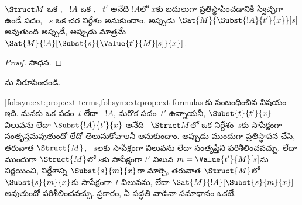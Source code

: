 \documentclass[../../../include/open-logic-section]{subfiles}
\begin{document}
\begin{prop} $\Struct M$ ఒక
, ~$!A$ ఒక , ~$t'$ అనేది $!A$లో $x$కు బదులుగా ప్రతిస్థాపించడానికి స్వేచ్ఛగా ఉండే పదం, ~$s$ ఒక చర
నిర్దేశం అనుకుందాం. అప్పుడు $\Sat{M}{\Subst{!A}{t'}{x}}[s]$ అవుతుంది
అప్పుడే, అప్పుడు మాత్రమే
$\Sat{M}{!A}[\Subst{s}{\Value{t'}{M}[s]}{x}]$.
\end{prop}

\begin{proof}
సాధన.
\end{proof}

\begin{prob}
ను నిరూపించండి.
\end{prob}

\begin{explain}
  \cref{fol:syn:ext:prop:ext-terms,fol:syn:ext:prop:ext-formulas}కు సంబంధించిన
  విషయం ఇది. మనకు ఒక పదం~$t$ లేదా ~$!A$, మరొక పదం~$t'$
  ఉన్నాయనీ, $\Subst{t}{t'}{x}$ విలువను లేదా
  $\Subst{!A}{t'}{x}$ అనేది ~$\Struct M$లో
  ఒక  నిర్దేశం~$s$కు సాపేక్షంగా సంతృప్తమవుతుందో లేదో
  తెలుసుకోవాలనీ అనుకుందాం. అప్పుడు ముందుగా ప్రతిస్థాపన చేసి, తరువాత
  $\Struct{M}$, ~$s$లకు సాపేక్షంగా విలువను లేదా సంతృప్తిని పరిశీలించవచ్చు.
  లేదా ముందుగా $\Struct{M}$లో $s$కు సాపేక్షంగా $t'$ విలువ
  $m = \Value{t'}{M}[s]$ను నిర్ణయించి,  నిర్దేశాన్ని
  $\Subst{s}{m}{x}$గా మార్చి, తరువాత $\Struct{M}$లో
  $\Subst{s}{m}{x}$కు సాపేక్షంగా~$t$ విలువను, లేదా
  $\Sat{M}{!A}[\Subst{s}{m}{x}]$ అవుతుందో పరిశీలించవచ్చు.
   ప్రకారం,
  ఏ పద్ధతి వాడినా సమాధానం ఒకటే.
\end{explain}
\end{document}

